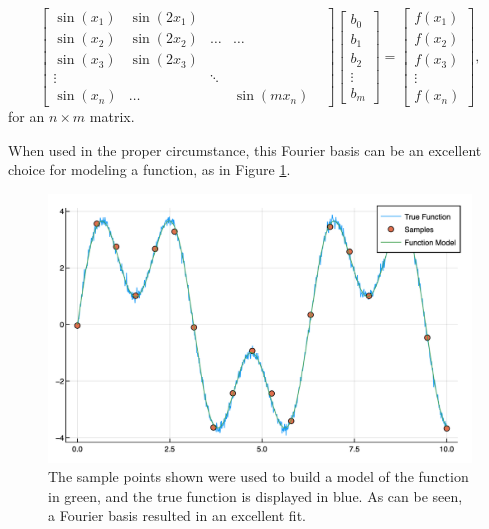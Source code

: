 \begin{equation} \label{fourierBasis}
\begin{bmatrix}
\sin(x_1) & \sin(2x_1) \\
\sin(x_2) & \sin(2x_2) & \ldots & \ldots \\
\sin(x_3) & \sin(2x_3) \\
\vdots & & \ddots & & \\
\sin(x_n) & \ldots & & \sin(mx_n)
\end{bmatrix}
\begin{bmatrix}
b_0 \\
b_1 \\
b_2 \\
\vdots \\
b_m 
\end{bmatrix}
=
\begin{bmatrix}
f(x_1) \\ 
f(x_2) \\
f(x_3) \\ 
\vdots \\
f(x_n)
\end{bmatrix},
\end{equation}
for an $n\times m$ matrix.
\par When used in the proper circumstance, this Fourier basis can be an excellent choice for modeling a function, as in Figure \ref{2dFourier}.

\begin{figure}[h]
\includegraphics[scale = 0.27]{Figures/2dFourier}
\caption{The sample points shown were used to build a model of the function in green, and the true function is displayed in blue. As can be seen, a Fourier basis resulted in an excellent fit. 
\label{2dFourier}} 
\end{figure}

